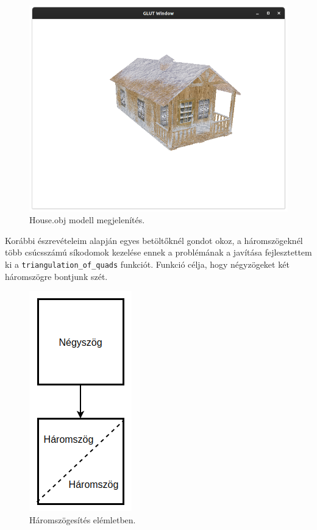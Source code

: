 \begin{figure}[h]
\centering
\includegraphics[width=\textwidth]{images/demo.png}
\caption{House.obj modell megjelenítés.}
\label{fig:demo}
\end{figure}
\newpage
{}
Korábbi észrevételeim alapján egyes betöltőknél gondot okoz, a háromszögeknél több csúcsszámú síkodomok kezelése ennek a problémának a javítása fejlesztettem ki a \texttt{triangulation\_of\_quads} funkciót. Funkció célja, hogy négyzögeket két háromszögre bontjunk szét.
\begin{figure}[h]
\centering
\includegraphics[scale=0.39]{images/triangulation.png}
\caption{Háromszögesítés elémletben.}
\label{fig:tri}
\end{figure}

